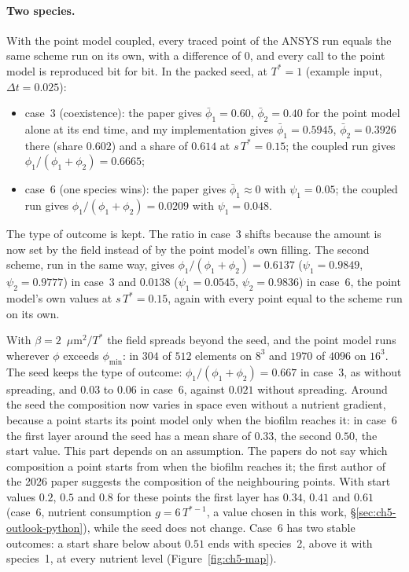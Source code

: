 \paragraph{Two species.} With the point model coupled, every traced point of
the ANSYS run equals the same scheme run on its own, with a difference of
$0$, and every call to the point model is reproduced bit for bit. In
the packed seed, at $T^*=1$ (example input, $\Delta t=0.025$):
\begin{itemize}
\item case~3 (coexistence): the paper gives $\bar\phi_1=0.60$, $\bar\phi_2=0.40$ for the point model
      alone at its end time, and my implementation gives $\bar\phi_1=0.5945$,
      $\bar\phi_2=0.3926$ there (share $0.602$) and a share of $0.614$ at
      $s\,T^*=0.15$; the coupled run gives $\phi_1/(\phi_1+\phi_2)=0.6665$;
\item case~6 (one species wins): the paper gives $\bar\phi_1\approx0$ with
      $\psi_1=0.05$; the coupled run gives $\phi_1/(\phi_1+\phi_2)=0.0209$ with $\psi_1=0.048$.
\end{itemize}
The type of outcome is kept. The ratio in case~3 shifts because the amount is
now set by the field instead of by the point model's own filling. The second
scheme, run in the same way, gives $\phi_1/(\phi_1+\phi_2)=0.6137$ ($\psi_1=0.9849$, $\psi_2=0.9777$) in
case~3 and $0.0138$ ($\psi_1=0.0545$, $\psi_2=0.9836$) in case~6, the point model's own values
at $s\,T^*=0.15$,
again with every point equal to the scheme run on its own.

With $\beta=2$~$\mu$m$^2/T^*$ the field spreads beyond the seed, and the point
model runs wherever $\phi$ exceeds $\phi_{\min}$: in $304$ of $512$ elements
on $8^3$ and $1970$ of $4096$ on $16^3$. The seed keeps the type of outcome:
$\phi_1/(\phi_1+\phi_2)=0.667$ in case~3, as without spreading, and $0.03$ to
$0.06$ in case~6, against $0.021$ without spreading. Around the seed the composition now varies in space even
without a nutrient gradient, because a point starts its point model only when
the biofilm reaches it: in case~6 the first layer around the seed has a mean
share of $0.33$, the second $0.50$, the start value. This part depends on an
assumption. The papers do not say which composition a point starts from when
the biofilm reaches it; the first author of the 2026 paper suggests the
composition of the neighbouring points. With start values $0.2$, $0.5$ and
$0.8$ for these points the first layer has $0.34$, $0.41$ and $0.61$ (case~6,
nutrient consumption $g=6\,T^{*-1}$, a value chosen in this work,
\S\ref{sec:ch5-outlook-python}), while the seed does not change. Case~6 has two stable
outcomes: a start share below about $0.51$ ends with species~2, above it with
species~1, at every nutrient level (Figure~\ref{fig:ch5-map}).

